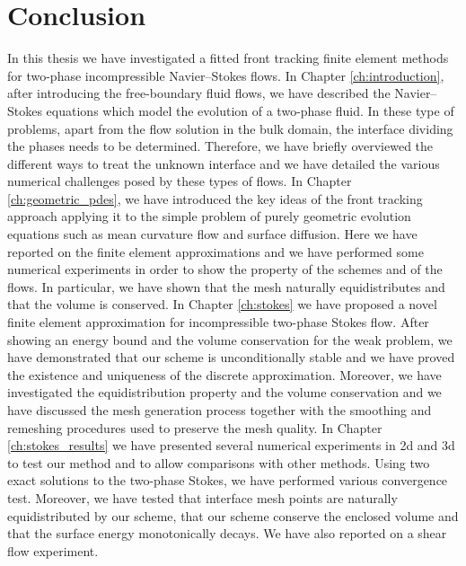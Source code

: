 \chapter{\sc Conclusion}\label{ch:conclusion}

In this thesis we have investigated a fitted front tracking finite element
methods for two-phase incompressible Navier--Stokes flows. In Chapter
\ref{ch:introduction}, after introducing the free-boundary fluid flows, we have
described the Navier--Stokes equations which model the evolution of a two-phase
fluid. In these type of problems, apart from the flow solution in the bulk
domain, the interface dividing the phases needs to be determined. Therefore, we
have briefly overviewed the different ways to treat the unknown interface and we
have detailed the various numerical challenges posed by these types of flows.
In Chapter \ref{ch:geometric_pdes}, we have introduced the key ideas of the
front tracking approach applying it to the simple problem of purely geometric
evolution equations such as mean curvature flow and surface diffusion. Here we
have reported on the finite element approximations and we have performed some
numerical experiments in order to show the property of the schemes and of the
flows. In particular, we have shown that the mesh naturally equidistributes and
that the volume is conserved. In Chapter \ref{ch:stokes} we have proposed a
novel finite element approximation for incompressible two-phase Stokes flow.
After showing an energy bound and the volume conservation for the weak problem,
we have demonstrated that our scheme is unconditionally stable and we have
proved the existence and uniqueness of the discrete approximation. Moreover, we
have investigated the equidistribution property and the volume conservation and
we have discussed the mesh generation process together with the smoothing and
remeshing procedures used to preserve the mesh quality. In Chapter
\ref{ch:stokes_results} we have presented several numerical experiments in 2d
and 3d to test our method and to allow comparisons with other methods. Using
two exact solutions to the two-phase Stokes, we have performed various
convergence test. Moreover, we have tested that interface mesh points are
naturally equidistributed by our scheme, that our scheme conserve the enclosed
volume and that the surface energy monotonically decays. We have also reported
on a shear flow experiment.

